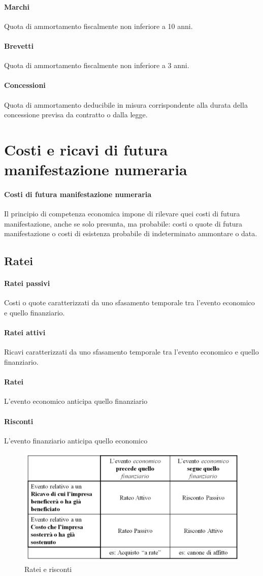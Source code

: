 \documentclass{report}
\begin{document}
	\paragraph{Marchi} Quota di ammortamento fiscalmente non inferiore a 10 anni.
	\paragraph{Brevetti} Quota di ammortamento fiscalmente non inferiore a 3 anni.
	\paragraph{Concessioni} Quota di ammortamento deducibile in misura corrispondente alla durata della concessione previsa da contratto o dalla legge.
	\section{Costi e ricavi di futura manifestazione numeraria}
	\paragraph{Costi di futura manifestazione numeraria} Il principio di competenza economica impone di rilevare quei costi di futura manifestazione, anche se solo presunta, ma probabile: costi o quote di futura manifestazione o costi di esistenza probabile di indeterminato ammontare o data.
	\subsection{Ratei}
	\paragraph{Ratei passivi} Costi o quote caratterizzati da uno sfasamento temporale tra l'evento economico e quello finanziario.
	\paragraph{Ratei attivi} Ricavi caratterizzati da uno sfasamento temporale tra l'evento economico e quello finanziario.
	\paragraph{Ratei} L'evento economico anticipa quello finanziario
	\paragraph{Risconti} L'evento finanziario anticipa quello economico
	\begin{figure}[h]
		\centering
		\includegraphics[width=0.7\linewidth]{ratei-risconti}
		\caption{Ratei e risconti}
		\label{fig:ratei-risconti}
	\end{figure}
\end{document}
